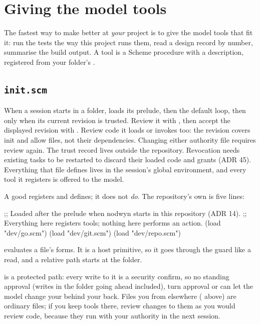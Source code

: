 \chapter{Giving the model tools}
\label{ch:tools}

The fastest way to make \nodwyn{} better at \emph{your} project is to give
the model tools that fit it: run the tests the way this project runs them,
read a design record by number, summarise the build output. A tool is a
Scheme procedure with a description, registered from your folder's
.

\section{\texttt{init.scm}}

When a session starts in a folder, \nodwyn{} loads its prelude, then the
default loop, then  only when its current
revision is trusted. Review it with , then
accept the displayed revision with . Review code it
loads or invokes too: the revision covers init and allow files, not their
dependencies. Changing either authority file requires review again. The trust
record lives outside the repository. Revocation needs existing tasks to be
restarted to discard their loaded code and grants (ADR 45).
Everything that file defines lives in the session's global environment, and
every tool it registers is offered to the model.

A good  registers and defines; it does not \emph{do}. The
\nodwyn{} repository's own is five lines:

\begin{scm}
;; Loaded after the prelude when nodwyn starts in this repository (ADR 14).
;; Everything here registers tools; nothing here performs an action.
(load "dev/go.scm")
(load "dev/git.scm")
(load "dev/repo.scm")
\end{scm}

 evaluates a file's forms. It is a host primitive, so it goes
through the guard like a read, and a relative path starts at the folder.

\begin{careful}
 is a protected path: every write to it is a security
confirm, so no standing approval (writes in the folder going ahead
included), turn approval or  can let the model change your
 behind your back. Files you
 from elsewhere ( above) are ordinary files; if you
keep tools there, review changes to them as you would review code, because
they run with your authority in the next session.
\end{careful}

